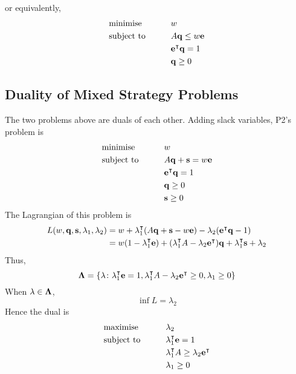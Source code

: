 or equivalently,
\begin{alignat*}{2}
	 & \text{minimise}   & \qquad & w                          \\
	 & \text{subject to} &        & A \vb q \leq w \vb e       \\
	 &                   &        & \vb e^\intercal \vb q = 1 \\
	 &                   &        & \vb q \geq 0
\end{alignat*}

\subsection{Duality of Mixed Strategy Problems}
The two problems above are duals of each other.
Adding slack variables, P2's problem is
\begin{alignat*}{2}
	 & \text{minimise}   & \qquad & w                          \\
	 & \text{subject to} &        & A \vb q + \vb s = w \vb e  \\
	 &                   &        & \vb e^\intercal \vb q = 1 \\
	 &                   &        & \vb q \geq 0               \\
	 &                   &        & \vb s \geq 0
\end{alignat*}
The Lagrangian of this problem is
\begin{align*}
	L(w, \vb q, \vb s, \vb\lambda_1, \lambda_2) & = w + \vb\lambda_1^\intercal (A\vb q + \vb s - w\vb e) - \lambda_2 (\vb e^\intercal \vb q - 1)                                                    \\
	                                            & = w(1 - \vb\lambda_1^\intercal \vb e) + (\vb\lambda_1^\intercal A - \lambda_2 \vb e^\intercal) \vb q + \vb \lambda_1^\intercal\vb s + \lambda_2
\end{align*}
Thus,
\[
	\vb\Lambda = \qty{\vb\lambda \colon \vb\lambda_1^\intercal\vb e = 1, \vb\lambda_1^\intercal A - \lambda_2\vb e^\intercal\geq 0, \vb \lambda_1 \geq 0}
\]
When \( \vb\lambda \in \vb\Lambda \),
\[
	\inf L = \lambda_2
\]
Hence the dual is
\begin{alignat*}{2}
	 & \text{maximise}   & \qquad & \lambda_2                                                 \\
	 & \text{subject to} &        & \vb\lambda_1^\intercal \vb e = 1                         \\
	 &                   &        & \vb\lambda_1^\intercal A \geq \lambda_2 \vb e^\intercal \\
	 &                   &        & \vb \lambda_1 \geq 0
\end{alignat*}
